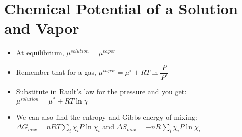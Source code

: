 \documentclass[12pt, openany, letterpaper]{memoir}
\begin{document}
\section*{Chemical Potential of a Solution and Vapor}
\begin{itemize}
	\item At equilibrium, $\mu^{solution} = \mu^{vapor}$
	\item Remember that for a gas, $\mu^{vapor} = \mu^\circ + RT\ln\dfrac{P}{P^\circ}$
	\item Substitute in Rault's law for the pressure and you get: $\mu^{solution} = \mu^*+RT\ln\chi$
	\item We can also find the entropy and Gibbs energy of mixing: $\Delta G_{mix} = nRT\sum\limits_i\chi_iP\ln\chi_i$ and $\Delta S_{mix} = -nR\sum\limits_i\chi_iP\ln\chi_i$
\end{itemize}
\end{document}
